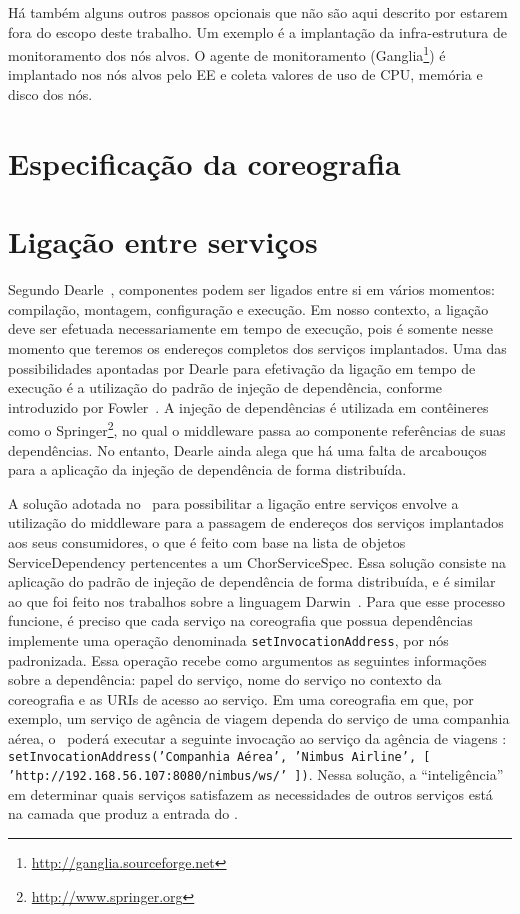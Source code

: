 Há também alguns outros passos opcionais que não são aqui descrito por estarem fora
do escopo deste trabalho. Um exemplo é a implantação da infra-estrutura de monitoramento
dos nós alvos. O agente de monitoramento 
(Ganglia\footnote{\url{http://ganglia.sourceforge.net}})
é implantado nos nós alvos pelo EE e
coleta valores de uso de CPU, memória e disco dos nós.

\section{Especificação da coreografia}
\label{sec:spec}

\section{Ligação entre serviços}
\label{sec:ligacao}

Segundo Dearle~\cite{Dearle2007PastPresentFuture}, componentes podem ser ligados entre si em vários momentos: compilação, montagem, configuração e execução. Em nosso contexto, a ligação deve ser efetuada necessariamente em tempo de execução, pois é somente nesse momento que teremos os endereços completos dos serviços implantados. Uma das possibilidades apontadas por Dearle para efetivação da ligação em tempo de execução é a utilização do padrão de injeção de dependência, conforme introduzido por Fowler~\cite{Fowler2004Inversion}. A injeção de dependências é utilizada em contêineres como o Springer\footnote{\url{http://www.springer.org}}, no qual o middleware passa ao componente referências de suas dependências. No entanto, Dearle ainda alega que há uma falta de arcabouços para a aplicação da injeção de dependência de forma distribuída.

A solução adotada no \ee\ para possibilitar a ligação entre serviços envolve a utilização do middleware para a passagem de endereços dos serviços implantados aos seus consumidores, o que é feito com base na lista de objetos \textsf{ServiceDependency} pertencentes a um \textsf{ChorServiceSpec}. Essa solução consiste na aplicação do padrão de injeção de dependência de forma distribuída, e é similar ao que foi feito nos trabalhos sobre a linguagem Darwin~\cite{Magee1996Dynamic, Magee1994Regis}. Para que esse processo funcione, é preciso que cada serviço na coreografia que possua dependências implemente uma operação denominada \texttt{setInvocationAddress}, por nós padronizada. Essa operação recebe como argumentos as seguintes informações sobre a dependência: papel do serviço, nome do serviço no contexto da coreografia e as URIs de acesso ao serviço.  Em uma coreografia em que, por exemplo, um serviço de agência de viagem dependa do serviço de uma companhia aérea, o \ee\ poderá executar a seguinte invocação ao serviço da agência de viagens : \texttt{setInvocationAddress('Companhia Aérea', 'Nimbus Airline', [ 'http://192.168.56.107:8080/nimbus/ws/' ])}. Nessa solução, a ``inteligência'' em determinar quais serviços satisfazem as necessidades de outros serviços está na camada que produz a entrada do \ee.

